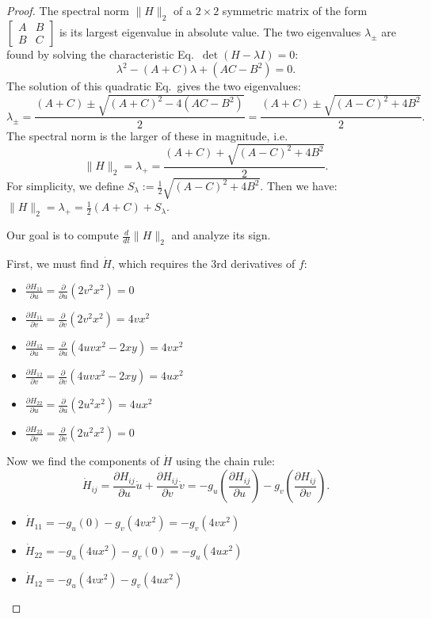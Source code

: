 \documentclass[a4paper,11pt]{article}
\newcommand{\1}{\mathbbm{1}}
\theoremstyle{plain}
\begin{document}
\begin{proof}
The spectral norm $\|H\|_2$ of a $2 \times 2$ symmetric matrix of the form $\begin{bmatrix}
    A &B \\ B & C
\end{bmatrix}$ is its largest eigenvalue in absolute value. The two eigenvalues $\lambda_{\pm}$ are found by solving the characteristic Eq.~$\det(H - \lambda I) = 0$:
$$
\lambda^2 - (A+C)\lambda + (AC - B^2) = 0.
$$
The solution of this quadratic Eq.~gives the two eigenvalues:
$$
\lambda_{\pm} = \frac{(A+C) \pm \sqrt{(A+C)^2 - 4(AC - B^2)}}{2} = \frac{(A+C) \pm \sqrt{(A-C)^2 + 4B^2}}{2}.
$$
The spectral norm is the larger of these in magnitude, i.e.
$$
\|H\|_2 = \lambda_{+} = \frac{(A+C) + \sqrt{(A-C)^2 + 4B^2}}{2}.
$$
For simplicity, we define $S_{\lambda} := \frac{1}{2} \sqrt{(A-C)^2 + 4B^2}$. Then we have:
$
\|H\|_2 = \lambda_{+} = \frac{1}{2}(A+C) + S_{\lambda}.
$


Our goal is to compute $\frac{d}{dt} \|H\|_2$ and analyze its sign. 


First, we must find $\dot{H}$, which requires the 3rd derivatives of $f$:
\begin{itemize}
    \item $\frac{\partial H_{11}}{\partial u} = \frac{\partial}{\partial u}(2v^2x^2) = 0$
    \item $\frac{\partial H_{11}}{\partial v} = \frac{\partial}{\partial v}(2v^2x^2) = 4vx^2$
    
    \item $\frac{\partial H_{12}}{\partial u} = \frac{\partial}{\partial u}(4uvx^2 - 2xy) = 4vx^2$
    \item $\frac{\partial H_{12}}{\partial v} = \frac{\partial}{\partial v}(4uvx^2 - 2xy) = 4ux^2$
    
    \item $\frac{\partial H_{22}}{\partial u} = \frac{\partial}{\partial u}(2u^2x^2) = 4ux^2$
    \item $\frac{\partial H_{22}}{\partial v} = \frac{\partial}{\partial v}(2u^2x^2) = 0$
\end{itemize}


Now we find the components of $\dot{H}$ using the chain rule: $$\dot{H}_{ij} = \frac{\partial H_{ij}}{\partial u} \dot{u} + \frac{\partial H_{ij}}{\partial v} \dot{v} = -g_u(\frac{\partial H_{ij}}{\partial u}) - g_v(\frac{\partial H_{ij}}{\partial v}).$$
\begin{itemize}
    \item $\dot{H}_{11} = -g_u(0) - g_v(4vx^2) = -g_v(4vx^2)$
    \item $\dot{H}_{22} = -g_u(4ux^2) - g_v(0) = -g_u(4ux^2)$
    \item $\dot{H}_{12} = -g_u(4vx^2) - g_v(4ux^2)$
\end{itemize}



\end{proof}
\end{document}
